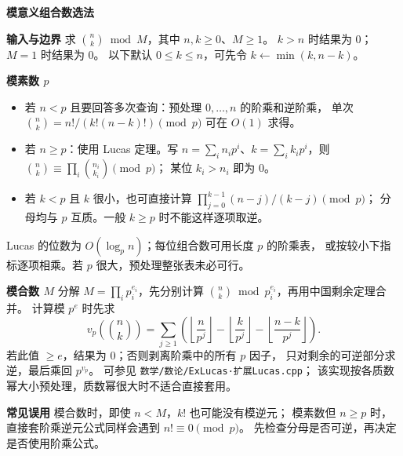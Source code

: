 \textbf{模意义组合数选法}

\textbf{输入与边界}
求 $\binom nk\bmod M$，其中 $n,k\ge0$、$M\ge1$。
$k>n$ 时结果为 $0$；$M=1$ 时结果为 $0$。
以下默认 $0\le k\le n$，可先令 $k\leftarrow\min(k,n-k)$。

\textbf{模素数 $p$}
\begin{itemize}
    \item 若 $n<p$ 且要回答多次查询：预处理 $0,\ldots,n$ 的阶乘和逆阶乘，
    单次 $\binom nk=n!/(k!(n-k)!)\pmod p$ 可在 $O(1)$ 求得。
    \item 若 $n\ge p$：使用 Lucas 定理。写
    $n=\sum_i n_ip^i$、$k=\sum_i k_ip^i$，则
    $\binom nk\equiv\prod_i\binom{n_i}{k_i}\pmod p$；
    某位 $k_i>n_i$ 即为 $0$。
    \item 若 $k<p$ 且 $k$ 很小，也可直接计算
    $\prod_{j=0}^{k-1}(n-j)/(k-j)\pmod p$；
    分母均与 $p$ 互质。一般 $k\ge p$ 时不能这样逐项取逆。
\end{itemize}
Lucas 的位数为 $O(\log_p n)$；每位组合数可用长度 $p$ 的阶乘表，
或按较小下指标逐项相乘。若 $p$ 很大，预处理整张表未必可行。

\textbf{模合数 $M$}
分解 $M=\prod_i p_i^{e_i}$，先分别计算
$\binom nk\bmod p_i^{e_i}$，再用中国剩余定理合并。
计算模 $p^e$ 时先求
\[
v_p\!\left(\binom nk\right)
=\sum_{j\ge1}\left(
\left\lfloor\frac n{p^j}\right\rfloor
-\left\lfloor\frac k{p^j}\right\rfloor
-\left\lfloor\frac{n-k}{p^j}\right\rfloor\right).
\]
若此值 $\ge e$，结果为 $0$；否则剥离阶乘中的所有 $p$ 因子，
只对剩余的可逆部分求逆，最后乘回 $p^{v_p}$。
可参见 \texttt{数学/数论/ExLucas·扩展Lucas.cpp}；
该实现按各质数幂大小预处理，质数幂很大时不适合直接套用。

\textbf{常见误用}
模合数时，即使 $n<M$，$k!$ 也可能没有模逆元；
模素数但 $n\ge p$ 时，直接套阶乘逆元公式同样会遇到 $n!\equiv0\pmod p$。
先检查分母是否可逆，再决定是否使用阶乘公式。

